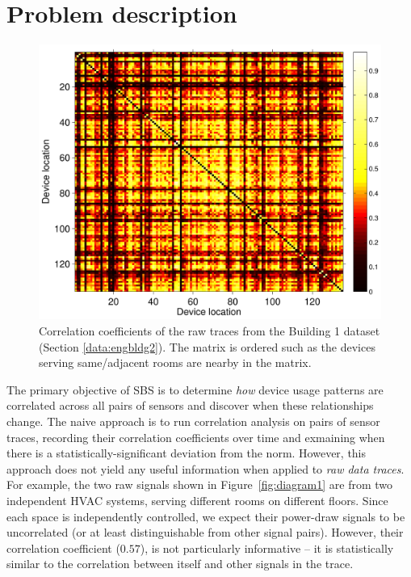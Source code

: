 \section{Problem description}
\begin{figure}
\begin{center}
\includegraphics[width=.5\textwidth]{img/heatMap_raw_201106-eps-converted-to.pdf}
\caption{Correlation coefficients of the raw traces from the Building 1 dataset (Section \ref{data:engbldg2}).
The matrix is ordered such as the devices serving same/adjacent rooms are nearby in the matrix.}
\label{fig:heatmap:raw}
\end{center}
\end{figure}

The primary objective of SBS is to determine \emph{how} device usage patterns are correlated across all pairs of sensors and 
discover when these relationships change.  
The naive approach is to run correlation analysis on pairs of sensor traces, recording their correlation coefficients over time and 
exmaining when there is a statistically-significant deviation from the norm.  
However, this approach does not yield any useful information when applied to \emph{raw data traces}.
For example, the two raw signals shown in Figure~\ref{fig:diagram1} are from two independent HVAC systems,
 serving different rooms on different floors.
Since each space is independently controlled, we expect their power-draw signals to be uncorrelated (or at least distinguishable 
from other signal pairs).  However, their correlation coefficient ($0.57$), is not particularly informative -- it is statistically
similar to the correlation between itself and other signals in the trace.  

